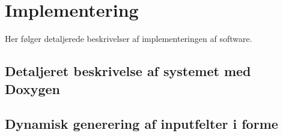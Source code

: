 \chapter{Implementering}

Her følger detaljerede beskrivelser af implementeringen af software.

\section{Detaljeret beskrivelse af systemet med Doxygen}



\section{Dynamisk generering af inputfelter i forme}


